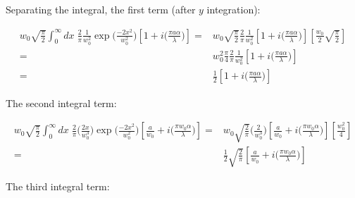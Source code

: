 \documentclass[aps,twoside,secnumarabic,balancelastpage,amsmath,amssymb,nofootinbib,hyperref=pdftex]{revtex4}
\begin{document}
Separating the integral, the first term (after $y$ integration):

\begin{align*}
w_0 \sqrt{ \frac{\pi}{2} }   \int_{0}^{\infty} dx \;
\frac{2}{\pi}
		\frac{1}{w_0^2}
		\exp \big( \frac{-2 x^2}{w_0^{2}} \big)
        \left[
				1+
				i \big( \frac{ \pi a \alpha}{ \lambda} \big)
			\right]
            =&
w_0 \sqrt{ \frac{\pi}{2} }
\frac{2}{\pi}
		\frac{1}{w_0^2}
        \left[
				1+
				i \big( \frac{ \pi a \alpha}{ \lambda} \big)
			\right] 
         \left[
             \frac{w_0}{2} \sqrt{\frac{\pi}{2}}
         \right]
        \\ =&
         w_0^2 { \frac{\pi}{4} }
\frac{2}{\pi}
		\frac{1}{w_0^2}
        \left[
				1+
				i \big( \frac{ \pi a \alpha}{ \lambda} \big)
			\right] 
                    \\ =&
         { \frac{1}{2} }
        \left[
				1+
				i \big( \frac{ \pi a \alpha}{ \lambda} \big)
			\right] 
\end{align*}

The second integral term:

\begin{align*}
w_0 \sqrt{ \frac{\pi}{2} }   \int_{0}^{\infty} dx \;
\frac{2}{\pi}\Big( \frac{2 x}{w_0^3} \Big)
		\exp \big( \frac{-2 x^2}{w_0^{2}} \big)	
        			\left[
			\frac{a}{w_{0}}		
			+
			i  \big( \frac{\pi w_{0} \alpha}{\lambda} \big)
			\right]
    =&
       w_0 \sqrt{ \frac{2}{\pi} } 
        \Big( \frac{2 }{w_0^3} \Big)
        	\left[
                \frac{a}{w_{0}}		
                +
                i  \big( \frac{\pi w_{0} \alpha}{\lambda} \big)
			\right] 
            \left[
                \frac{w_0^2}{4}
            \right]
       \\ =&
       \frac{1}{2}
       \sqrt{ \frac{2}{\pi} } 
        	\left[
                \frac{a}{w_{0}}		
                +
                i  \big( \frac{\pi w_{0} \alpha}{\lambda} \big)
			\right] 
\end{align*}

The third integral term:
\end{document}
